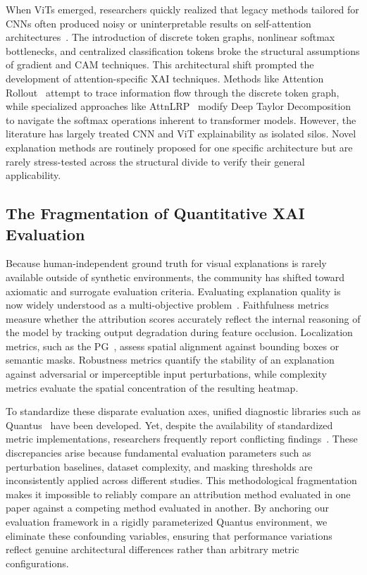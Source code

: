 \documentclass[final,5p,times,twocolumn]{elsarticle}
\begin{document}
When ViTs emerged, researchers quickly realized that legacy methods tailored for CNNs often produced noisy or uninterpretable results on self-attention architectures~\cite{chefer2021transformer}. The introduction of discrete token graphs, nonlinear softmax bottlenecks, and centralized classification tokens broke the structural assumptions of gradient and CAM techniques. This architectural shift prompted the development of attention-specific XAI techniques. Methods like Attention Rollout~\cite{abnar2020rollout} attempt to trace information flow through the discrete token graph, while specialized approaches like AttnLRP~\cite{achtibat2024attnlrp} modify Deep Taylor Decomposition to navigate the softmax operations inherent to transformer models. However, the literature has largely treated CNN and ViT explainability as isolated silos. Novel explanation methods are routinely proposed for one specific architecture but are rarely stress-tested across the structural divide to verify their general applicability.

\subsection{The Fragmentation of Quantitative XAI Evaluation}
Because human-independent ground truth for visual explanations is rarely available outside of synthetic environments, the community has shifted toward axiomatic and surrogate evaluation criteria. Evaluating explanation quality is now widely understood as a multi-objective problem~\cite{nauta2023anecdotal,bhatt2020faithfulness}. Faithfulness metrics measure whether the attribution scores accurately reflect the internal reasoning of the model by tracking output degradation during feature occlusion. Localization metrics, such as the PG~\cite{zhang2018pointing}, assess spatial alignment against bounding boxes or semantic masks. Robustness metrics quantify the stability of an explanation against adversarial or imperceptible input perturbations, while complexity metrics evaluate the spatial concentration of the resulting heatmap.

To standardize these disparate evaluation axes, unified diagnostic libraries such as Quantus~\cite{hedstrom2023quantus} have been developed. Yet, despite the availability of standardized metric implementations, researchers frequently report conflicting findings~\cite{rao2022attribution,brandt2023precise}. These discrepancies arise because fundamental evaluation parameters such as perturbation baselines, dataset complexity, and masking thresholds are inconsistently applied across different studies. This methodological fragmentation makes it impossible to reliably compare an attribution method evaluated in one paper against a competing method evaluated in another. By anchoring our evaluation framework in a rigidly parameterized Quantus environment, we eliminate these confounding variables, ensuring that performance variations reflect genuine architectural differences rather than arbitrary metric configurations.
\end{document}
